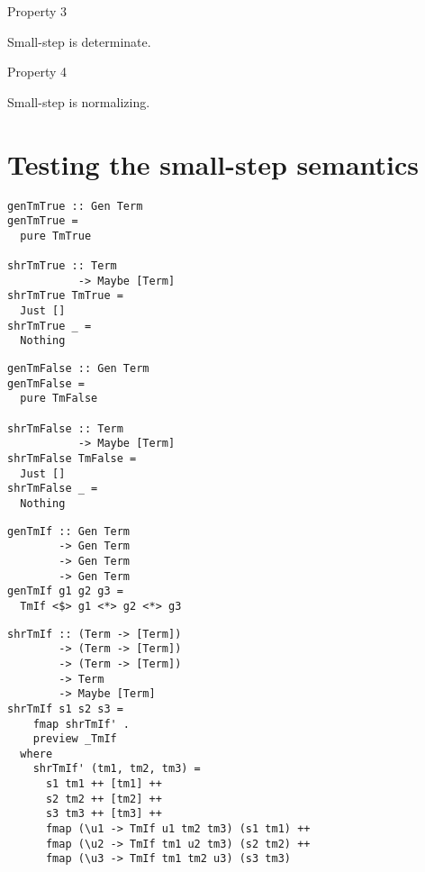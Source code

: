\documentclass{beamer}
\begin{document}
\begin{frame}[c]
  Property 3
  \begin{center}
Small-step is determinate.
  \end{center}
\end{frame}

\begin{frame}[c]
  Property 4
  \begin{center}
Small-step is normalizing.
  \end{center}
\end{frame}

\section{Testing the small-step semantics}

\begin{frame}[fragile]
  \begin{verbatim}
genTmTrue :: Gen Term
genTmTrue = 
  pure TmTrue

shrTmTrue :: Term 
           -> Maybe [Term]
shrTmTrue TmTrue = 
  Just []
shrTmTrue _ = 
  Nothing
  \end{verbatim}
\end{frame}

\begin{frame}[fragile]
  \begin{verbatim}
genTmFalse :: Gen Term
genTmFalse = 
  pure TmFalse

shrTmFalse :: Term 
           -> Maybe [Term]
shrTmFalse TmFalse = 
  Just []
shrTmFalse _ = 
  Nothing
  \end{verbatim}
\end{frame}

\begin{frame}[fragile]
  \begin{verbatim}
genTmIf :: Gen Term 
        -> Gen Term 
        -> Gen Term 
        -> Gen Term
genTmIf g1 g2 g3 = 
  TmIf <$> g1 <*> g2 <*> g3
  \end{verbatim}
\end{frame}

\begin{frame}[fragile]
  \begin{verbatim}
shrTmIf :: (Term -> [Term]) 
        -> (Term -> [Term]) 
        -> (Term -> [Term]) 
        -> Term 
        -> Maybe [Term]
shrTmIf s1 s2 s3 = 
    fmap shrTmIf' . 
    preview _TmIf
  where
    shrTmIf' (tm1, tm2, tm3) =
      s1 tm1 ++ [tm1] ++
      s2 tm2 ++ [tm2] ++
      s3 tm3 ++ [tm3] ++
      fmap (\u1 -> TmIf u1 tm2 tm3) (s1 tm1) ++
      fmap (\u2 -> TmIf tm1 u2 tm3) (s2 tm2) ++
      fmap (\u3 -> TmIf tm1 tm2 u3) (s3 tm3)
  \end{verbatim}
\end{frame}
\end{document}
